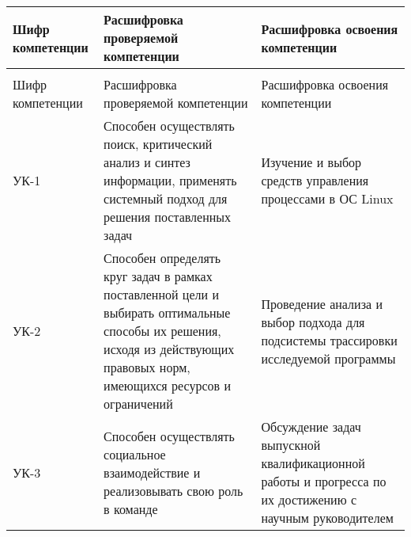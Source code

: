 {
\fontsize{12}{9}\selectfont
\vspace*{-12pt}
\noindent \begin{longtable}[c]{|p{2.2cm}|p{6.5cm}|p{6.5cm}|}
\hline
Шифр компетенции & Расшифровка проверяемой компетенции & Расшифровка освоения компетенции\\
\hline
\endfirsthead
\caption*{\raggedright\hspace{-10pt} Продолжение таблицы 1\vspace*{-35pt}}\\
\hline
Шифр компетенции & Расшифровка проверяемой компетенции & Расшифровка освоения компетенции\\
\hline
\endhead
УК-1 &
Способен осуществлять поиск, критический анализ и синтез информации, применять системный подход для решения поставленных задач &
Изучение и выбор средств управления процессами в ОС Linux
\\ \hline

УК-2 &
Способен определять круг задач в рамках поставленной цели и выбирать оптимальные способы их решения, исходя из действующих правовых норм, имеющихся ресурсов и ограничений &
Проведение анализа и выбор подхода для подсистемы трассировки исследуемой программы
\\ \hline

УК-3 &
Способен осуществлять социальное взаимодействие и реализовывать свою роль в команде &
Обсуждение задач выпускной квалификационной работы и прогресса по их достижению с научным руководителем
\\ \hline


\end{longtable}}

